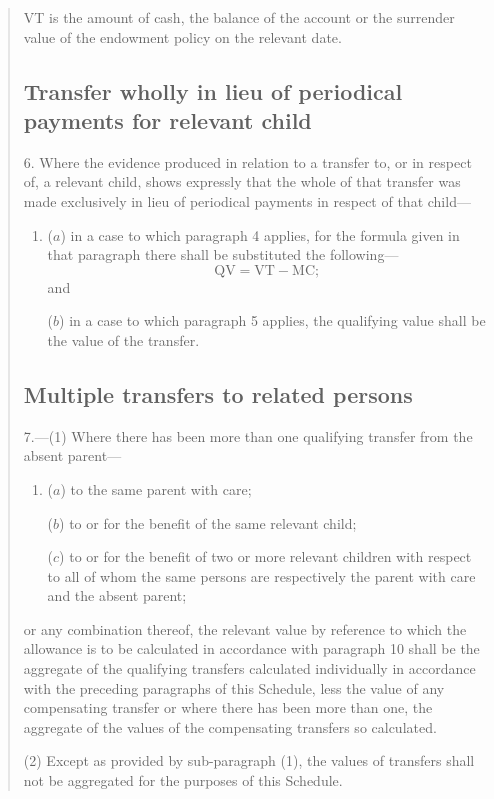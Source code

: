 \documentclass[a4paper]{article}
\begin{document}
\begin{quotation}
\begin{enumerate}
VT is the amount of cash, the balance of the account or the surrender value of the endowment policy on the relevant date.
\end{enumerate}

\subsection*{Transfer wholly in lieu of periodical payments for relevant child}

6.  Where the evidence produced in relation to a transfer to, or in respect of, a relevant child, shows expressly that the whole of that transfer was made exclusively in lieu of periodical payments in respect of that child—
\begin{enumerate}\item[]
($a$) in a case to which paragraph 4 applies, for the formula given in that paragraph there shall be substituted the following—
\[\mathrm{QV} = \mathrm{VT} - \mathrm{MC};\]
and

($b$) in a case to which paragraph 5 applies, the qualifying value shall be the value of the transfer.
\end{enumerate}

\subsection*{Multiple transfers to related persons}

7.—(1) Where there has been more than one qualifying transfer from the absent parent—
\begin{enumerate}\item[]
($a$) to the same parent with care;

($b$) to or for the benefit of the same relevant child;

($c$) to or for the benefit of two or more relevant children with respect to all of whom the same persons are respectively the parent with care and the absent parent;
\end{enumerate}
or any combination thereof, the relevant value by reference to which the allowance is to be calculated in accordance with paragraph 10 shall be the aggregate of the qualifying transfers calculated individually in accordance with the preceding paragraphs of this Schedule, less the value of any compensating transfer or where there has been more than one, the aggregate of the values of the compensating transfers so calculated.

(2) Except as provided by sub-paragraph (1), the values of transfers shall not be aggregated for the purposes of this Schedule.


\end{quotation}
\end{document}
